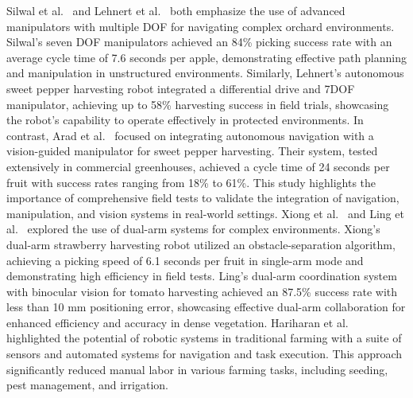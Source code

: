 \documentclass[a4paper,fleqn]{cas-dc}
\begin{document}
Silwal et al.~\cite{silwal2017design} and Lehnert et al.~\cite{lehnert2017autonomous} both emphasize the use of advanced manipulators with multiple DOF for navigating complex orchard environments. Silwal's seven DOF manipulators achieved an 84\% picking success rate with an average cycle time of 7.6 seconds per apple, demonstrating effective path planning and manipulation in unstructured environments. Similarly, Lehnert's autonomous sweet pepper harvesting robot integrated a differential drive and 7DOF manipulator, achieving up to 58\% harvesting success in field trials, showcasing the robot's capability to operate effectively in protected environments.
In contrast, Arad et al.~\cite{arad2020development} focused on integrating autonomous navigation with a vision-guided manipulator for sweet pepper harvesting. Their system, tested extensively in commercial greenhouses, achieved a cycle time of 24 seconds per fruit with success rates ranging from 18\% to 61\%. This study highlights the importance of comprehensive field tests to validate the integration of navigation, manipulation, and vision systems in real-world settings.
Xiong et al.~\cite{xiong2020autonomous} and Ling et al.~\cite{ling2019dual} explored the use of dual-arm systems for complex environments. Xiong's dual-arm strawberry harvesting robot utilized an obstacle-separation algorithm, achieving a picking speed of 6.1 seconds per fruit in single-arm mode and demonstrating high efficiency in field tests. Ling's dual-arm coordination system with binocular vision for tomato harvesting achieved an 87.5\% success rate with less than 10 mm positioning error, showcasing effective dual-arm collaboration for enhanced efficiency and accuracy in dense vegetation.
Hariharan et al.~\cite{hariharanautobot} highlighted the potential of robotic systems in traditional farming with a suite of sensors and automated systems for navigation and task execution. This approach significantly reduced manual labor in various farming tasks, including seeding, pest management, and irrigation.
\end{document}
